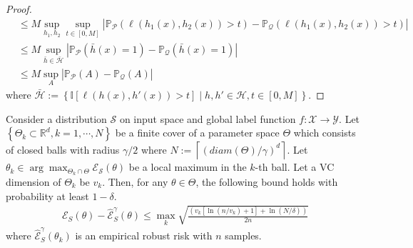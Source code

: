 \begin{proof}
\begin{align}
    &\leq M\sup_{h_{1},h_{2}}\sup_{t\in[0,M]} \left|\mathbb{P}_{\mathcal{P}}\left(\ell(h_{1}(x),h_{2}(x)) > t\right) -  \mathbb{P}_{\mathcal{Q}}\left(\ell(h_{1}(x),h_{2}(x)) > t\right) \right|\\
    &\leq M\sup_{\bar{h}\in\bar{\mathcal{H}}}\left|\mathbb{P}_{\mathcal{P}}\left(\bar{h}(x)=1\right) -  \mathbb{P}_{\mathcal{Q}}\left(\bar{h}(x)=1\right) \right|\\
    &\leq M\sup_{A}\left|\mathbb{P}_{\mathcal{P}}\left(A\right) -  \mathbb{P}_{\mathcal{Q}}\left(A\right) \right|
\end{align}
where $\bar{\mathcal{H}}:=\left\{\mathbb{I}[\ell(h(x),h'(x))>t]\middle|h,h'\in\mathcal{H}, t \in [0,M]\right\}$.
\end{proof}

\begin{lemma}\label{lem:gen_bnd_rrm}
Consider a distribution $\mathcal{S}$ on input space and global label function $f:\mathcal{X}\rightarrow\mathcal{Y}$.
Let $\left\{\Theta_{k}\subset\mathbb{R}^{d}, k=1,\cdots,N\right\}$ be a finite cover of a parameter space $\Theta$ which consists of closed balls with radius $\gamma/2$ where $N:=\left\lceil\left(diam(\Theta)/\gamma\right)^{d}\right\rceil$.
Let $\theta_{k}\in\arg\max_{\Theta_{k}\cap\Theta}\mathcal{E}_{\mathcal{S}}(\theta)$ be a local maximum in the $k$-th ball.
Let a VC dimension of $\Theta_{k}$ be $v_{k}$. Then, for any $\theta\in\Theta$,
the following bound holds with probability at least $1-\delta$.
\begin{align}
    \mathcal{E}_{S}(\theta) - \hat{\mathcal{E}}_{S}^{\gamma}(\theta) \leq \max_{k}\sqrt{\frac{\left(v_{k}\left[\ln\left(n/v_{k}\right)+1\right]+\ln\left(N/\delta\right)\right)}{2n}}
\end{align}
where $\hat{\mathcal{E}}_{S}^{\gamma}(\theta_{k})$ is an empirical robust risk with $n$ samples.
\end{lemma}
